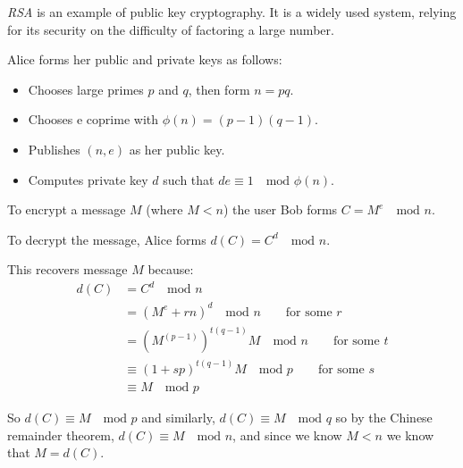 \documentclass[12pt]{article}
\begin{document}
\emph{RSA} is an example of public key cryptography. It is a widely used system, relying for its security on the difficulty of factoring a large number.

Alice forms her public and private keys as follows:
\begin{itemize}
\item Chooses large primes $p$ and $q$, then form $n=pq$.
\item Chooses e coprime with $\phi (n) = (p-1)(q-1)$.
\item Publishes $(n,e)$ as her public key.
\item Computes private key $d$ such that $de \equiv 1 \quad\textrm{mod } \phi(n)$.
\end{itemize}

To encrypt a message $M$ (where $M < n$) the user Bob  forms $C = M^e \quad\textrm{mod } n$.

To decrypt the message, Alice forms $d(C) = C^d \quad\textrm{mod } n$.

This recovers message $M$ because:
\begin{align*}
d(C) &= C^d \quad\textrm{mod } n \\
     &= (M^e + rn)^d \quad\textrm{mod } n \qquad \textrm{for some }r \\
     &= (M^{(p-1)})^{t(q-1)}M \quad\textrm{mod } n \qquad \textrm{for some }t\\
     &\equiv (1+sp)^{t(q-1)}M \quad\textrm{mod } p \qquad \textrm{for some }s \\
     &\equiv M \quad\textrm{mod } p
\end{align*}

So $d(C) \equiv M \quad\textrm{mod } p$ and similarly, $d(C) \equiv M \quad\textrm{mod } q$ so by the Chinese remainder theorem, $d(C) \equiv M \quad\textrm{mod } n$, and since we know $M<n$ we know that $M = d(C)$.
\end{document}
